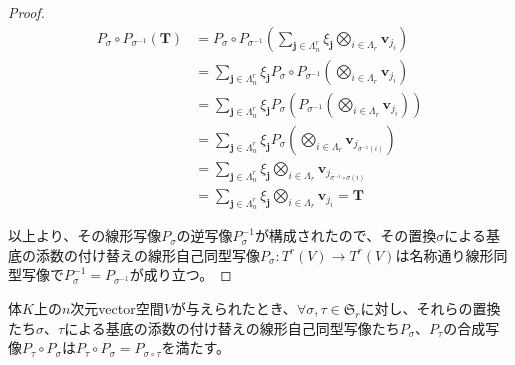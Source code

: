 \documentclass[dvipdfmx]{jsarticle}
\begin{document}
\begin{proof}
\begin{align*}
P_{\sigma} \circ P_{\sigma^{- 1}}\left( \mathbf{T} \right) &= P_{\sigma} \circ P_{\sigma^{- 1}}\left( \sum_{\mathbf{j} \in \varLambda_{n}^{r}} {\xi_{\mathbf{j}}\bigotimes_{i \in \varLambda_{r}} \mathbf{v}_{j_{i}}} \right)\\
&= \sum_{\mathbf{j} \in \varLambda_{n}^{r}} {\xi_{\mathbf{j}}P_{\sigma} \circ P_{\sigma^{- 1}}\left( \bigotimes_{i \in \varLambda_{r}} \mathbf{v}_{j_{i}} \right)}\\
&= \sum_{\mathbf{j} \in \varLambda_{n}^{r}} {\xi_{\mathbf{j}}P_{\sigma}\left( P_{\sigma^{- 1}}\left( \bigotimes_{i \in \varLambda_{r}} \mathbf{v}_{j_{i}} \right) \right)}\\
&= \sum_{\mathbf{j} \in \varLambda_{n}^{r}} {\xi_{\mathbf{j}}P_{\sigma}\left( \bigotimes_{i \in \varLambda_{r}} \mathbf{v}_{j_{\sigma^{- 1}(i)}} \right)}\\
&= \sum_{\mathbf{j} \in \varLambda_{n}^{r}} {\xi_{\mathbf{j}}\bigotimes_{i \in \varLambda_{r}} \mathbf{v}_{j_{\sigma^{- 1} \circ \sigma(i)}}}\\
&= \sum_{\mathbf{j} \in \varLambda_{n}^{r}} {\xi_{\mathbf{j}}\bigotimes_{i \in \varLambda_{r}} \mathbf{v}_{j_{i}}} = \mathbf{T}
\end{align*}\par
以上より、その線形写像$P_{\sigma}$の逆写像$P_{\sigma}^{- 1}$が構成されたので、その置換$\sigma$による基底の添数の付け替えの線形自己同型写像$P_{\sigma}:T^{r}(V) \rightarrow T^{r}(V)$は名称通り線形同型写像で$P_{\sigma}^{- 1} = P_{\sigma^{- 1}}$が成り立つ。
\end{proof}
\begin{thm}\label{2.4.8.6}
体$K$上の$n$次元vector空間$V$が与えられたとき、$\forall\sigma,\tau \in \mathfrak{S}_{r}$に対し、それらの置換たち$\sigma$、$\tau$による基底の添数の付け替えの線形自己同型写像たち$P_{\sigma}$、$P_{\tau}$の合成写像$P_{\tau} \circ P_{\sigma}$は$P_{\tau} \circ P_{\sigma} = P_{\sigma \circ \tau}$を満たす。
\end{thm}
\end{document}
